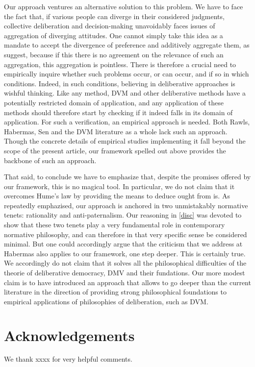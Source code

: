\documentclass[version=3.21, pagesize, twoside=off, bibliography=totoc, DIV=calc, fontsize=12pt, a4paper, french, english]{scrartcl}
\newenvironment{acknowledgements}{
	\section*{Acknowledgements}
}{
}
\begin{document}
Our approach ventures an alternative solution to this problem. 
We have to face the fact that, if various people can diverge in their considered judgments, collective deliberation and decision-making unavoidably faces issues of aggregation of diverging attitudes. 
One cannot simply take this idea as a mandate to accept the divergence of preference and additively aggregate them, as \citet{bartkowski_beyond_2018} suggest, because if this there is no agreement on the relevance of such an aggregation, this aggregation is pointless. 
There is therefore a crucial need to empirically inquire whether such problems occur, or can occur, and if so in which conditions. Indeed, in such conditions, believing in deliberative approaches is wishful thinking. 
Like any method, DVM and other deliberative methods have a potentially restricted domain of application, and any application of these methods should therefore start by checking if it indeed falls in its domain of application. 
For such a verification, an empirical approach is needed. 
Both Rawls, Habermas, Sen and the DVM literature as a whole lack such an approach. 
Though the concrete details of empirical studies implementing it fall beyond the scope of the present article, our framework spelled out above provides the backbone of such an approach.

That said, to conclude we have to emphasize that, despite the promises offered by our framework, this is no magical tool. 
In particular, we do not claim that it overcomes Hume's law by providing the means to deduce ought from is. 
As repeatedly emphazised, our approach is anchored in two unmistakably normative tenets: rationality and anti-paternalism. 
Our reasoning in \cref{disc} was devoted to show that these two tenets play a very fundamental role in contemporary normative philosophy, and can therefore in that very specific sense be considered minimal. 
But one could accordingly argue that the criticism that we address at Habermas also applies to our framework, one step deeper. This is certainly true. 
We accordingly do not claim that it solves all the philosophical difficulties of the theorie of deliberative democracy, DMV and their fundations. 
Our more modest claim is to have introduced an approach that allows to go deeper than the current literature in the direction of providing strong philosophical foundations to empirical applications of philosophies of deliberation, such as DVM. 


\begin{acknowledgements}
We thank xxxx for very helpful comments.
\end{acknowledgements}


\end{document}
